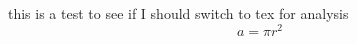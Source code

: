 \documentclass{article}
\numberwithin{equation}{section}
\begin{document}
this is a test to see if I should switch to tex for analysis
\begin{equation}
	a = \pi r^2
\end{equation}
\end{document}
